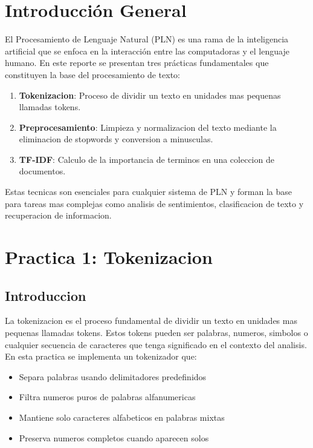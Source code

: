 \documentclass[12pt,a4paper]{article}
\begin{document}
\section{Introducción General}

El Procesamiento de Lenguaje Natural (PLN) es una rama de la inteligencia artificial que se enfoca en la interacción entre las computadoras y el lenguaje humano. En este reporte se presentan tres prácticas fundamentales que constituyen la base del procesamiento de texto:

\begin{enumerate}
    \item \textbf{Tokenizacion}: Proceso de dividir un texto en unidades mas pequenas llamadas tokens.
    \item \textbf{Preprocesamiento}: Limpieza y normalizacion del texto mediante la eliminacion de stopwords y conversion a minusculas.
    \item \textbf{TF-IDF}: Calculo de la importancia de terminos en una coleccion de documentos.
\end{enumerate}

Estas tecnicas son esenciales para cualquier sistema de PLN y forman la base para tareas mas complejas como analisis de sentimientos, clasificacion de texto y recuperacion de informacion.

\newpage

\section{Practica 1: Tokenizacion}

\subsection{Introduccion}

La tokenizacion es el proceso fundamental de dividir un texto en unidades mas pequenas llamadas tokens. Estos tokens pueden ser palabras, numeros, simbolos o cualquier secuencia de caracteres que tenga significado en el contexto del analisis. En esta practica se implementa un tokenizador que:

\begin{itemize}
    \item Separa palabras usando delimitadores predefinidos
    \item Filtra numeros puros de palabras alfanumericas
    \item Mantiene solo caracteres alfabeticos en palabras mixtas
    \item Preserva numeros completos cuando aparecen solos
\end{itemize}
\end{document}

